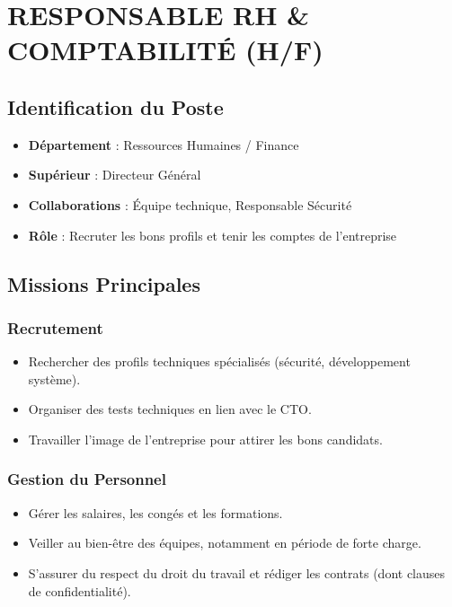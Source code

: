 \documentclass[12pt,a4paper]{article}
\begin{document}
\section{RESPONSABLE RH \& COMPTABILITÉ (H/F)}

\subsection{Identification du Poste}
\begin{itemize}[label=\textbullet]
    \item \textbf{Département} : Ressources Humaines / Finance
    \item \textbf{Supérieur} : Directeur Général
    \item \textbf{Collaborations} : Équipe technique, Responsable Sécurité
    \item \textbf{Rôle} : Recruter les bons profils et tenir les comptes de l'entreprise
\end{itemize}

\subsection{Missions Principales}

\subsubsection{Recrutement}
\begin{itemize}[label=\textbullet]
    \item Rechercher des profils techniques spécialisés (sécurité, développement système).
    \item Organiser des tests techniques en lien avec le CTO.
    \item Travailler l'image de l'entreprise pour attirer les bons candidats.
\end{itemize}

\subsubsection{Gestion du Personnel}
\begin{itemize}[label=\textbullet]
    \item Gérer les salaires, les congés et les formations.
    \item Veiller au bien-être des équipes, notamment en période de forte charge.
    \item S'assurer du respect du droit du travail et rédiger les contrats (dont clauses de confidentialité).
\end{itemize}
\end{document}
